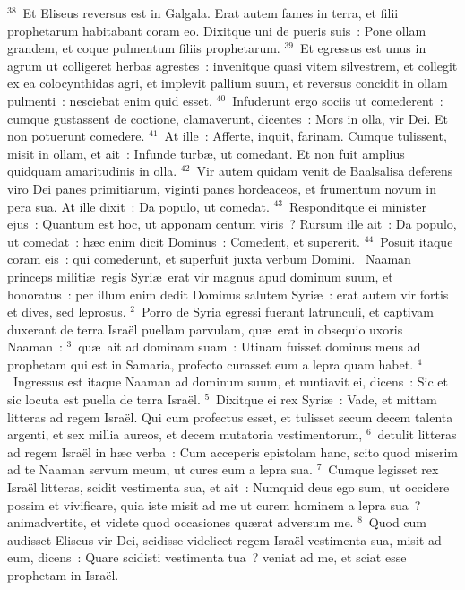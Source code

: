 ${}^{38}$~Et Eliseus reversus est in Galgala. Erat autem fames in terra, et filii prophetarum habitabant coram eo. Dixitque uni de pueris suis~: Pone ollam grandem, et coque pulmentum filiis prophetarum.
${}^{39}$~Et egressus est unus in agrum ut colligeret herbas agrestes~: invenitque quasi vitem silvestrem, et collegit ex ea colocynthidas agri, et implevit pallium suum, et reversus concidit in ollam pulmenti~: nesciebat enim quid esset.
${}^{40}$~Infuderunt ergo sociis ut comederent~: cumque gustassent de coctione, clamaverunt, dicentes~: Mors in olla, vir Dei. Et non potuerunt comedere.
${}^{41}$~At ille~: Afferte, inquit, farinam. Cumque tulissent, misit in ollam, et ait~: Infunde turb\ae , ut comedant. Et non fuit amplius quidquam amaritudinis in olla.
${}^{42}$~Vir autem quidam venit de Baalsalisa deferens viro Dei panes primitiarum, viginti panes hordeaceos, et frumentum novum in pera sua. At ille dixit~: Da populo, ut comedat.
${}^{43}$~Responditque ei minister ejus~: Quantum est hoc, ut apponam centum viris~? Rursum ille ait~: Da populo, ut comedat~: h\ae c enim dicit Dominus~: Comedent, et supererit.
${}^{44}$~Posuit itaque coram eis~: qui comederunt, et superfuit juxta verbum Domini.
~\lettrine[lines=10,image=true,loversize=0.05,lraise=-0.03]{N}{}aaman princeps militi\ae\ regis Syri\ae\ erat vir magnus apud dominum suum, et honoratus~: per illum enim dedit Dominus salutem Syri\ae~: erat autem vir fortis et dives, sed leprosus.
${}^{2}$~Porro de Syria egressi fuerant latrunculi, et captivam duxerant de terra Isra\"el puellam parvulam, qu\ae\ erat in obsequio uxoris Naaman~:
${}^{3}$~qu\ae\ ait ad dominam suam~: Utinam fuisset dominus meus ad prophetam qui est in Samaria, profecto curasset eum a lepra quam habet.
${}^{4}$~Ingressus est itaque Naaman ad dominum suum, et nuntiavit ei, dicens~: Sic et sic locuta est puella de terra Isra\"el.
${}^{5}$~Dixitque ei rex Syri\ae~: Vade, et mittam litteras ad regem Isra\"el. Qui cum profectus esset, et tulisset secum decem talenta argenti, et sex millia aureos, et decem mutatoria vestimentorum,
${}^{6}$~detulit litteras ad regem Isra\"el in h\ae c verba~: Cum acceperis epistolam hanc, scito quod miserim ad te Naaman servum meum, ut cures eum a lepra sua.
${}^{7}$~Cumque legisset rex Isra\"el litteras, scidit vestimenta sua, et ait~: Numquid deus ego sum, ut occidere possim et vivificare, quia iste misit ad me ut curem hominem a lepra sua~? animadvertite, et videte quod occasiones qu\ae rat adversum me.
${}^{8}$~Quod cum audisset Eliseus vir Dei, scidisse videlicet regem Isra\"el vestimenta sua, misit ad eum, dicens~: Quare scidisti vestimenta tua~? veniat ad me, et sciat esse prophetam in Isra\"el.
